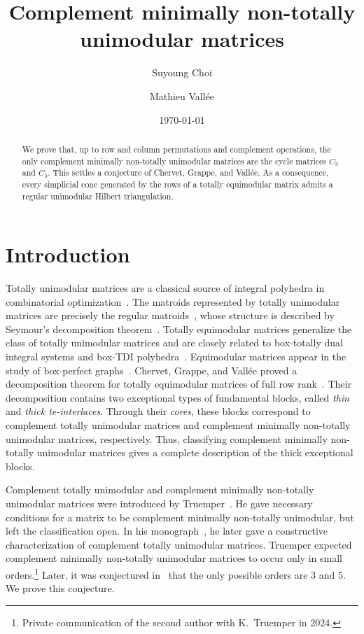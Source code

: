 \documentclass{amsart}
\title{Complement minimally non-totally unimodular matrices}
\author{Suyoung Choi}
\author{Mathieu Vall\'ee}
\date{\today}
\numberwithin{equation}{section}
\begin{document}
\begin{abstract}
    We prove that, up to row and column permutations and complement operations, the only complement minimally non-totally unimodular matrices are the cycle matrices $C_3$ and $C_5$. 
    This settles a conjecture of Chervet, Grappe, and Vall\'ee. 
    As a consequence, every simplicial cone generated by the rows of a totally equimodular matrix admits a regular unimodular Hilbert triangulation.
\end{abstract}
\maketitle

\section{Introduction}
Totally unimodular matrices are a classical source of integral polyhedra in combinatorial optimization~\cite{Schrijver_1999, Conforti-Cornuejols-Zambelli2014book}.
The matroids represented by totally unimodular matrices are precisely the regular matroids~\cite{Tutte1958}, whose structure is described by Seymour's decomposition theorem~\cite{Seymour1980}.
Totally equimodular matrices generalize the class of totally unimodular matrices and are closely related to box-totally dual integral systems and box-TDI polyhedra~\cite{Chervet-Grappe-Robert2021,Lancini-Pisanu2026}.
Equimodular matrices appear in the study of box-perfect graphs~\cite{Chervet_Grappe_2024}.
Chervet, Grappe, and Vall\'ee proved a decomposition theorem for totally equimodular matrices of full row rank~\cite{Chervet_Grappe_Vallee_2026}.
Their decomposition contains two exceptional types of fundamental blocks, called \emph{thin} and \emph{thick te-interlaces}.
Through their \emph{cores}, these blocks correspond to complement totally unimodular matrices and complement minimally non-totally unimodular matrices, respectively.
Thus, classifying complement minimally non-totally unimodular matrices gives a complete description of the thick exceptional blocks.

Complement totally unimodular and complement minimally non-totally unimodular matrices were introduced by Truemper~\cite{Truemper1980}.
He gave necessary conditions for a matrix to be complement minimally non-totally unimodular, but left the classification open.
In his monograph~\cite{Truemper1992book}, he later gave a constructive characterization of complement totally unimodular matrices.
Truemper expected complement minimally non-totally unimodular matrices to occur only in small orders.\footnote{Private communication of the second author with K.~Truemper in 2024.}
Later, it was conjectured in~\cite[Conjecture~3.14]{Chervet_Grappe_Vallee_2026} that the only possible orders are $3$ and $5$.
We prove this conjecture.
\end{document}
